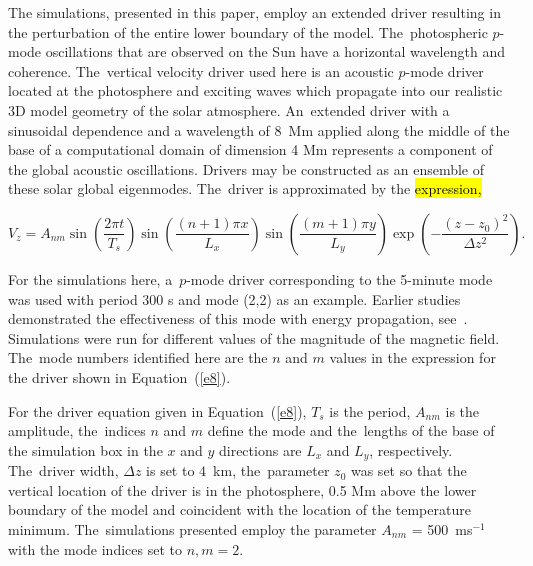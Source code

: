 \documentclass[physics,article,accept,pdftex,moreauthors]{Definitions/mdpi}
\begin{document}
The simulations, presented in this paper, employ an extended driver resulting in the perturbation of the entire lower boundary of the model.  The~photospheric $p$-mode oscillations  that are observed on the Sun have a horizontal wavelength and coherence. The~vertical velocity driver used here is an acoustic $p$-mode driver located at the photosphere and exciting waves which propagate into our realistic 3D model geometry of the solar atmosphere. An~extended driver with a sinusoidal dependence and a wavelength of 8~Mm applied along the middle of the base of a computational domain of dimension 4 Mm represents  a 
component of the global acoustic oscillations. Drivers may be constructed as an ensemble of these solar global eigenmodes. The~driver is approximated by the 
 \hl{expression,} %


\begin{equation}
 V_{z}  =  A_{nm} \sin\left(\frac{2\pi t}{T_s} \right)\sin\left(  \frac{(n+1)\pi x}{L_x} \right)  
 \sin\left(\frac{(m+1)\pi y}{L_y} \right) \exp\left( -\frac{(z-z_0)^2}{\Delta z^2} \right). %
\label{e8}
\end{equation}

For the  simulations here, a~$p$-mode driver corresponding to the 5-minute mode was used with period 300 s and mode (2,2) as an example. Earlier studies demonstrated the effectiveness of this mode with energy propagation, see~\cite{Griffiths2018b}. Simulations were run for different values of the magnitude of the magnetic field. The~mode numbers identified here are the $n$ and $m$ values in the expression for the driver shown in Equation~(\ref{e8}).











For the driver equation given in Equation~(\ref{e8}), $T_{s}$ is the period, $A_{nm}$ is the amplitude, the~indices $n$ and $m$ define the mode and the~lengths of the base of the simulation box in the $x$ and $y$ directions are $L_{x}$ and $L_{y}$, respectively. The~driver width, $\Delta z$ is set to $4$~km, the~parameter $z_{0}$ was set so that the vertical location of the driver is in the photosphere, 0.5 Mm above the lower boundary of the model and coincident with the location of the temperature minimum. The~simulations presented employ the parameter $A_{nm}$ = 500\, ms$^{-1}$ with the mode indices set to $n,m=2$. 
\end{document}
